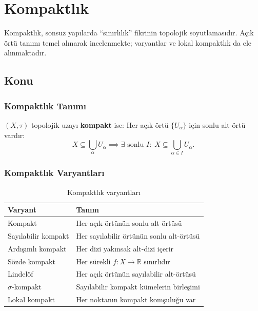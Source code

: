 \chapter{Kompaktlık}

Kompaktlık, sonsuz yapılarda ``sınırlılık'' fikrinin topolojik soyutlamasıdır.
Açık örtü tanımı temel alınarak incelenmekte; varyantlar ve lokal kompaktlık da ele alınmaktadır.

\section{Konu}

\subsection{Kompaktlık Tanımı}

\begin{definition}
$(X, \tau)$ topolojik uzayı \textbf{kompakt} ise:
Her açık örtü $\{U_\alpha\}$ için sonlu alt-örtü vardır:
\[
X \subseteq \bigcup_{\alpha} U_\alpha
\implies
\exists \text{ sonlu } I:\; X \subseteq \bigcup_{\alpha \in I} U_\alpha.
\]
\end{definition}

\subsection{Kompaktlık Varyantları}

\begin{table}[h]
\centering
\begin{tabular}{ll}
\toprule
\textbf{Varyant} & \textbf{Tanım} \\
\midrule
Kompakt & Her açık örtünün sonlu alt-örtüsü \\
Sayılabilir kompakt & Her sayılabilir örtünün sonlu alt-örtüsü \\
Ardışımlı kompakt & Her dizi yakınsak alt-dizi içerir \\
Sözde kompakt & Her sürekli $f: X \to \mathbb{R}$ sınırlıdır \\
Lindelöf & Her açık örtünün sayılabilir alt-örtüsü \\
$\sigma$-kompakt & Sayılabilir kompakt kümelerin birleşimi \\
Lokal kompakt & Her noktanın kompakt komşuluğu var \\
\bottomrule
\end{tabular}
\caption{Kompaktlık varyantları}
\end{table}

